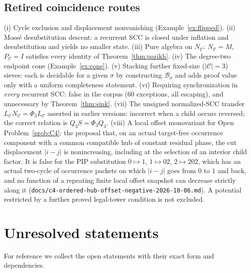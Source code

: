\documentclass[11pt]{amsart}
\theoremstyle{plain}
\theoremstyle{definition}
\theoremstyle{remark}
\newcommand{\B}{\mathcal{B}}
\newcommand{\cC}{\mathcal{C}}
\begin{document}
\subsection{Retired coincidence routes}
(i) Cycle exclusion and displacement nonvanishing (Example~\ref{ex:flipped}). (ii) Moss\'e desubstitution descent: a recurrent SCC is closed under inflation and desubstitution and yields no smaller state. (iii) Pure algebra on $N_\cC$: $N_\cC=M$, $P_\cC=I$ satisfies every identity of Theorem~\ref{thm:parikh}. (iv) The degree-two endpoint cone (Example~\ref{ex:cone}). (v) Stacking further fixed-size ($|\cC|=3$) sieves: each is decidable for a given $\sigma$ by constructing $\B_\sigma$ and adds proof value only with a uniform completeness statement. (vi) Requiring synchronization in \emph{every} recurrent SCC: false in the corpus ($60$ exceptions, all escaping), and unnecessary by Theorem~\ref{thm:sink}. (vii) The unsigned normalized-SCC transfer $L_\cC N_\cC=\Phi_3L_\cC$ asserted in earlier versions: incorrect when a child occurs reversed; the correct relation is $Q_3S=\Phi_3Q_3$. (viii) A local offset monovariant for Open Problem~\ref{prob:C4}: the proposal that, on an actual target-free occurrence component with a common compatible hub of constant residual phase, the cut displacement $|i-j|$ is nonincreasing, including at the selection of an interior child factor. It is false for the PIP substitution $0\mapsto1$, $1\mapsto02$, $2\mapsto202$, which has an actual two-cycle of occurrence packets on which $|i-j|$ goes from $0$ to $1$ and back, and no function of a repeating finite local offset snapshot can decrease strictly along it (\texttt{docs/c4-ordered-hub-offset-negative-2026-10-06.md}). A potential restricted by a further proved legal-tower condition is not excluded.

\section{Unresolved statements}\label{sec:open}

For reference we collect the open statements with their exact form and dependencies.
\end{document}
